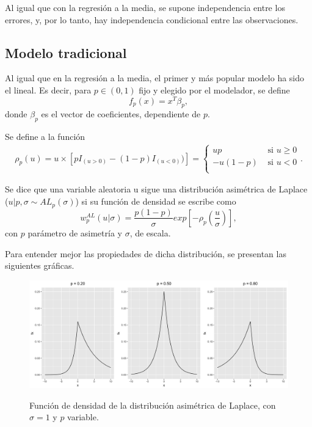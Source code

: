 Al igual que con la regresi\'on a la media, se supone independencia entre los errores, y, por lo tanto, hay independencia condicional entre las observaciones.

\subsection{Modelo tradicional}

Al igual que en la regresi\'on a la media, el primer y m\'as popular modelo ha sido el lineal. Es decir, para $p \in (0,1)$ fijo y elegido por el modelador, se define
\begin{equation*}
    f_p(x) = x^T\beta_p, 
\end{equation*}
donde $\beta_p$ es el vector de coeficientes, dependiente de $p$.

\begin{defin}
    Se define a la funci\'on
    \begin{equation*}
    \begin{aligned}
        \rho_p(u) = u \times [pI_{(u>0)} - (1-p) I_{(u<0)})]
        =
        \begin{cases}
            up &\text{ si } u\geq0 \\
            -u(1-p) &\text{ si } u<0 \\
        \end{cases}
        .
    \end{aligned}
    \end{equation*}

    Se dice que una variable aleatoria u sigue una distribuci\'on asim\'etrica de Laplace ($u|p,\sigma \sim AL_p(\sigma)$) si su funci\'on de densidad se escribe como
    \begin{equation*}
        w_p^{AL}(u|\sigma) = 
        \frac{p(1-p)}{\sigma}
        exp\left[
        -\rho_p
        \left(
        \frac{u}{\sigma}
        \right)
        \right],
    \end{equation*}
con $p$ par\'ametro de asimetr\'ia y $\sigma$, de escala.
\end{defin}

Para entender mejor las propiedades de dicha distribuci\'on, se presentan las siguientes gr\'aficas.
\begin{figure}[H]
	\centering
	\caption{Funci\'on de densidad de la distribuci\'on asim\'etrica de Laplace, con $\sigma = 1$ y $p$ variable.}
	\includegraphics[width=1\textwidth]{Figures/ALD/p_plots.png}
	\label{p_plots}
\end{figure}

